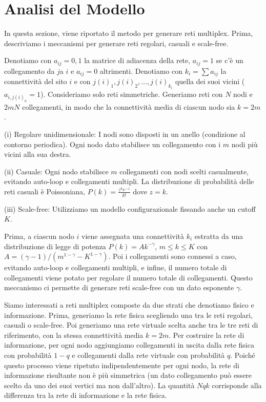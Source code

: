 \section{Analisi del Modello}\label{sec:analisi-del-modello}
In questa sezione, viene riportato il metodo per generare reti multiplex.
Prima, descriviamo i meccanismi per generare reti regolari, casuali e scale-free.

Denotiamo con $a_{ij} = 0,1$ la matrice di adiacenza della rete, $a_{ij} = 1$ se c'è un collegamento da
$j$a $i$ e $a_{ij} = 0$ altrimenti.
Denotiamo con $k_i = \sum a_{ij}$ la connettività del sito $i$ e con $j(i)_1, j(i)_2, \dots, j(i)_{k_i}$
quella dei suoi vicini ($a_{i,j(i)_n} =1$). Consideriamo solo reti simmetriche.
Generiamo reti con $N$ nodi e $2mN$ collegamenti, in modo che la connettività media di ciascun nodo sia $k =2m$.

(i) Regolare unidimensionale: I nodi sono disposti in un anello (condizione al contorno periodica).
Ogni nodo dato stabilisce un collegamento con i $m$ nodi più vicini alla sua destra.

(ii) Casuale: Ogni nodo stabilisce $m$ collegamenti con nodi scelti casualmente, evitando auto-loop e collegamenti
multipli.
La distribuzione di probabilità delle reti casuali è Poissoniana, $P(k) = \frac{z^k e^{-z}}{k!}$ dove $z = k$.

(iii) Scale-free: Utilizziamo un modello configurazionale fissando anche un cutoff $K$.

Prima, a ciascun nodo $i$ viene assegnata una connettività $k_i$ estratta da una distribuzione di legge di potenza
$P(k) = A k^{-\gamma}$, $m \leq k \leq K$ con $A=(\gamma -1)/(m^{1-\gamma} -K^{1-\gamma})$.
Poi i collegamenti sono connessi a caso, evitando auto-loop e collegamenti multipli, e infine,
il numero totale di collegamenti viene potato per regolare il numero totale di collegamenti.
Questo meccanismo ci permette di generare reti scale-free con un dato esponente $\gamma$.

Siamo interessati a reti multiplex composte da due strati che denotiamo fisico e informazione.
Prima, generiamo la rete fisica scegliendo una tra le reti regolari, casuali o scale-free.
Poi generiamo una rete virtuale scelta anche tra le tre reti di riferimento, con la stessa connettività media $k =2m$.
Per costruire la rete di informazione, per ogni nodo aggiungiamo collegamenti in uscita dalla rete fisica con
probabilità $1-q$ e collegamenti dalla rete virtuale con probabilità $q$.
Poiché questo processo viene ripetuto indipendentemente per ogni nodo, la rete di informazione risultante non è più
simmetrica (un dato collegamento può essere scelto da uno dei suoi vertici ma non dall'altro).
La quantità $Nqk$ corrisponde alla differenza tra la rete di informazione e la rete fisica.


